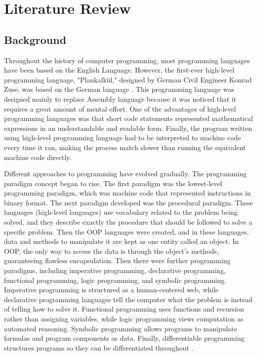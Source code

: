 \chapter{Literature Review}\label{chap:Literature Review}
\section{Background}
Throughout the history of computer programming, most programming languages have been based on the English Language. However, the first-ever high-level programming language, "Plankalkül," designed by German Civil Engineer Konrad Zuse, was based on the German language \cite{arawjo2020write}. This programming language was designed mainly to replace Assembly language because it was noticed that it requires a great amount of mental effort. One of the advantages of high-level programming languages was that short code statements represented mathematical expressions in an understandable and readable form. Finally, the program written using high-level programming language had to be interpreted to machine code every time it ran, making the process match slower than running the equivalent machine code directly.

Different approaches to programming have evolved gradually. The programming paradigm concept began to rise. The first paradigm was the lowest-level programming paradigm, which was machine code that represented instructions in binary format. The next paradigm developed was the procedural paradigm. These languages (high-level languages) use vocabulary related to the problem being solved, and they describe exactly the procedure that should be followed to solve a specific problem. Then the \ac{OOP} languages were created, and in these languages, data and methods to manipulate it are kept as one entity called an object. In OOP, the only way to access the data is through the object's methods, guaranteeing flawless encapsulation. Then there were further programming paradigms, including imperative programming, declarative programming, functional programming, logic programming, and symbolic programming. Imperative programming is structured as a human-centered web, while declarative programming languages tell the computer what the problem is instead of telling how to solve it. Functional programming uses functions and recursion rather than assigning variables, while logic programming views computation as automated reasoning. Symbolic programming allows programs to manipulate formulas and program components as data. Finally, differentiable programming structures programs so they can be differentiated throughout \cite{programmingparadigms}.

